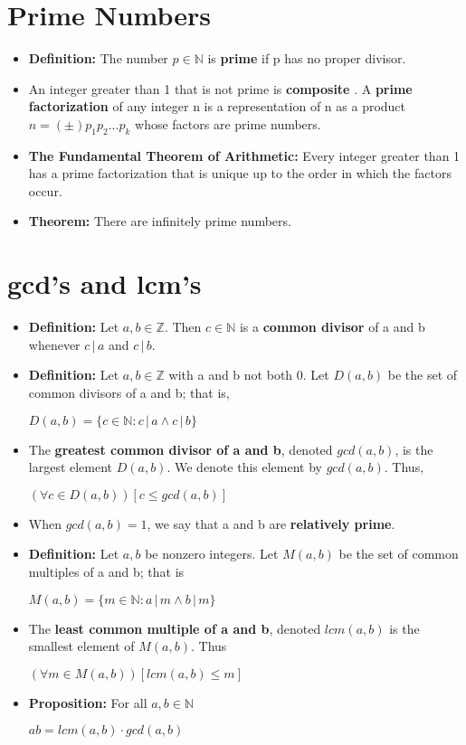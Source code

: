 \documentclass{report}
\begin{document}
	\section{Prime Numbers}
		\begin{itemize}\addtolength{\leftskip}{2em}
			\item \textbf{Definition:} The number $p\in\mathbb{N}$ is \textbf{prime} if p has no proper divisor.
			\item An integer greater than 1 that is not prime is \textbf{composite }. A \textbf{prime factorization} of any integer n is a representation of n as a product $n=(\pm)p_1p_2...p_k$ whose factors are prime numbers.
			\item \textbf{The Fundamental Theorem of Arithmetic:} Every integer greater than 1 has a prime factorization that is unique up to the order in which the factors occur.
			\item \textbf{Theorem:} There are infinitely prime numbers.
		\end{itemize}
	\section{gcd's and lcm's}
		\begin{itemize}\addtolength{\leftskip}{2em}
			\item \textbf{Definition:} Let $a,b\in\mathbb{Z}$. Then $c\in\mathbb{N}$ is a \textbf{common divisor} of a and b whenever $c\,|\,a$ and $c\,|\,b$.
			\item \textbf{Definition:} Let $a,b\in\mathbb{Z}$ with a and b not both 0. Let $D(a,b)$ be the set of common divisors of a and b; that is,
			\begin{center}
			$D(a,b)=\{c\in\mathbb{N}:c\,|\,a\wedge c\,|\,b\}$
			\end{center}
			\item The \textbf{greatest common divisor of a and b}, denoted $gcd(a,b)$, is the largest element $D(a,b)$. We denote this element by $gcd(a,b)$. Thus,
			\begin{center}
			$(\forall c\in D(a,b))[c\le gcd(a,b)]$
			\end{center}
			\item When $gcd(a,b)=1$, we say that a and b are \textbf{relatively prime}.
			\item \textbf{Definition:} Let $a,b$ be nonzero integers. Let $M(a,b)$ be the set of common multiples of a and b; that is
			\begin{center}
			$M(a,b)=\{m\in\mathbb{N}:a\,|\,m\wedge b\,|\, m\}$
			\end{center}
			\item The \textbf{least common multiple of a and b}, denoted $lcm(a,b)$ is the smallest element of $M(a,b)$. Thus
			\begin{center}
			$(\forall m\in M(a,b))[lcm(a,b)\le m]$
			\end{center}
			\item \textbf{Proposition:} For all $a,b\in\mathbb{N}$
			\begin{center}
			$ab=lcm(a,b)\cdot gcd(a,b)$
			\end{center}
		\end{itemize}
\end{document}
